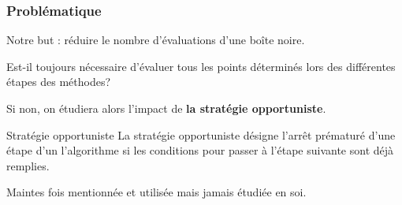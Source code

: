 \documentclass{beamer}
\begin{document}
\begin{frame}%
\frametitle{Problématique}
Notre but : réduire le nombre d'évaluations d'une boîte noire.
\pause
\medskip

Est-il toujours nécessaire d'évaluer tous les points déterminés lors des différentes étapes des méthodes?
\pause
\medskip

Si non, on étudiera alors l'impact de \textbf{la stratégie opportuniste}.

\pause
{\begin{block}{Stratégie opportuniste}
		La stratégie opportuniste désigne l'arrêt prématuré d'une étape d'un l'algorithme si les conditions pour passer à l'étape suivante sont déjà remplies.
\end{block}}
\pause
\medskip

Maintes fois  mentionnée et utilisée mais jamais étudiée en soi.
\end{frame}
\end{document}

